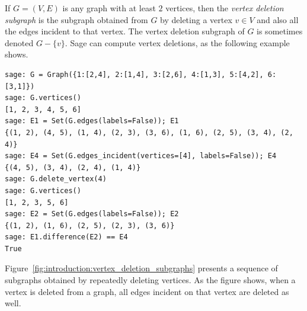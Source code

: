 If $G = (V,E)$ is any graph with at least $2$ vertices, then the
\emph{vertex deletion subgraph} is the subgraph obtained from $G$ by
deleting a vertex $v \in V$ and also all the edges incident to that
vertex. The vertex deletion subgraph of $G$ is sometimes denoted
$G - \{v\}$.
Sage can compute vertex deletions, as the following example shows.
%
\begin{lstlisting}
sage: G = Graph({1:[2,4], 2:[1,4], 3:[2,6], 4:[1,3], 5:[4,2], 6:[3,1]})
sage: G.vertices()
[1, 2, 3, 4, 5, 6]
sage: E1 = Set(G.edges(labels=False)); E1
{(1, 2), (4, 5), (1, 4), (2, 3), (3, 6), (1, 6), (2, 5), (3, 4), (2, 4)}
sage: E4 = Set(G.edges_incident(vertices=[4], labels=False)); E4
{(4, 5), (3, 4), (2, 4), (1, 4)}
sage: G.delete_vertex(4)
sage: G.vertices()
[1, 2, 3, 5, 6]
sage: E2 = Set(G.edges(labels=False)); E2
{(1, 2), (1, 6), (2, 5), (2, 3), (3, 6)}
sage: E1.difference(E2) == E4
True
\end{lstlisting}
%
Figure~\ref{fig:introduction:vertex_deletion_subgraphs}
presents a sequence of subgraphs obtained by repeatedly deleting
vertices. As the figure shows, when a vertex is deleted from a graph,
all edges incident on that vertex are deleted as well.

